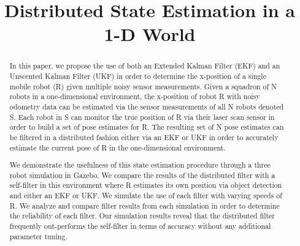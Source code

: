 \documentclass[conference]{IEEEtran} \usepackage[T1]{fontenc} \usepackage[backend=biber, style=ieee]{biblatex}
\begin{document}
\title{Distributed State Estimation in a 1-D World}


\author{   }

\maketitle

\begin{abstract}
In this paper, we propose the use of both an Extended Kalman Filter (EKF) and an Unscented Kalman
Filter (UKF) in order to determine the x-position of a single mobile robot (R) given multiple noisy sensor measurements.
Given a squadron of N robots in a one-dimensional environment, the x-position of robot R with noisy odometry data can be
estimated via the sensor measurements of all N robots denoted S. Each robot in S can monitor the true position of R via
their laser scan sensor in order to build a set of pose estimates for R. The resulting set of N pose estimates can be
filtered in a distributed fashion either via an EKF or UKF in order to accurately estimate the current pose of R in the
one-dimensional environment.

We demonstrate the usefulness of this state estimation procedure through a three robot simulation in Gazebo. We compare
the results of the distributed filter with a self-filter in this environment where R estimates its own position via
object detection and either an EKF or UKF. We simulate the use of each filter with varying speeds of R. We analyze and
compare filter results from each simulation in order to determine the reliability of each filter. Our simulation results
reveal that the distributed filter frequently out-performs the self-filter in terms of accuracy without any additional
parameter tuning.
\end{abstract}
\end{document}
